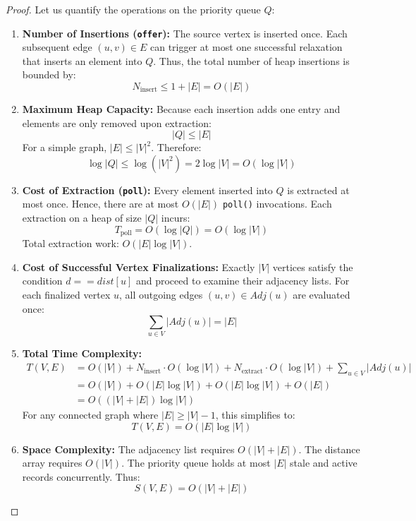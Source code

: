 \documentclass[10pt,journal,compsoc,onecolumn]{IEEEtran}
\begin{document}
\begin{proof}
Let us quantify the operations on the priority queue $Q$:
\begin{enumerate}
    \item \textbf{Number of Insertions (\texttt{offer}):} The source vertex is inserted once. Each subsequent edge $(u, v) \in E$ can trigger at most one successful relaxation that inserts an element into $Q$. Thus, the total number of heap insertions is bounded by:
    \begin{equation}
    N_{\text{insert}} \le 1 + |E| = O(|E|)
    \end{equation}
    \item \textbf{Maximum Heap Capacity:} Because each insertion adds one entry and elements are only removed upon extraction:
    \begin{equation}
    |Q| \le |E|
    \end{equation}
    For a simple graph, $|E| \le |V|^2$. Therefore:
    \begin{equation}
    \log |Q| \le \log(|V|^2) = 2 \log |V| = O(\log |V|)
    \end{equation}
    \item \textbf{Cost of Extraction (\texttt{poll}):} Every element inserted into $Q$ is extracted at most once. Hence, there are at most $O(|E|)$ \texttt{poll()} invocations. Each extraction on a heap of size $|Q|$ incurs:
    \begin{equation}
    T_{\text{poll}} = O(\log |Q|) = O(\log |V|)
    \end{equation}
    Total extraction work: $O(|E| \log |V|)$.
    \item \textbf{Cost of Successful Vertex Finalizations:} Exactly $|V|$ vertices satisfy the condition $d == dist[u]$ and proceed to examine their adjacency lists. For each finalized vertex $u$, all outgoing edges $(u, v) \in Adj(u)$ are evaluated once:
    \begin{equation}
    \sum_{u \in V} |Adj(u)| = |E|
    \end{equation}
    \item \textbf{Total Time Complexity:}
    \begin{align}
    T(V, E) &= O(|V|) + N_{\text{insert}} \cdot O(\log |V|) + N_{\text{extract}} \cdot O(\log |V|) + \sum_{u \in V} |Adj(u)| \nonumber \\
    &= O(|V|) + O(|E| \log |V|) + O(|E| \log |V|) + O(|E|) \nonumber \\
    &= O((|V| + |E|) \log |V|)
    \end{align}
    For any connected graph where $|E| \ge |V| - 1$, this simplifies to:
    \begin{equation}
    T(V, E) = O(|E| \log |V|)
    \end{equation}
    \item \textbf{Space Complexity:} The adjacency list requires $O(|V| + |E|)$. The distance array requires $O(|V|)$. The priority queue holds at most $|E|$ stale and active records concurrently. Thus:
    \begin{equation}
    S(V, E) = O(|V| + |E|)
    \end{equation}
\end{enumerate}
\end{proof}
\end{document}
